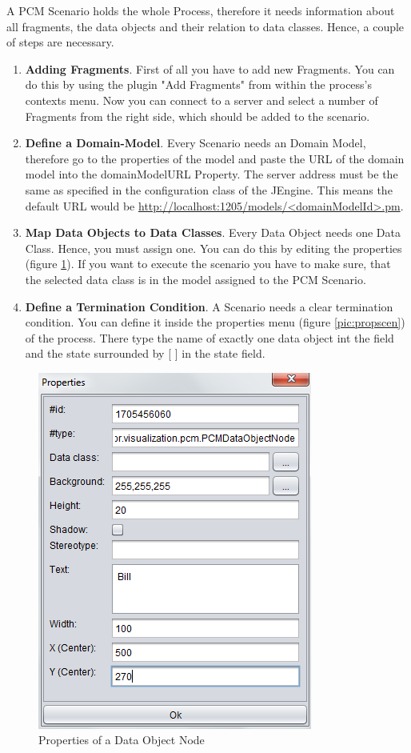 A PCM Scenario holds the whole Process, therefore it needs information about all fragments, the data objects and their relation to data classes. Hence, a couple of steps are necessary.
\begin{enumerate}
\item \textbf{Adding Fragments}.
First of all you have to add new Fragments. You can do this by using the plugin "Add Fragments" from within the process's contexts menu. Now you can connect to a server and select a number of Fragments from the right side, which should be added to the scenario.
\item \textbf{Define a Domain-Model}.
Every Scenario needs an Domain Model, therefore go to the properties of the model and paste the URL of the domain model into the domainModelURL Property. The server address must be the same as specified in the configuration class of the JEngine. This means the default URL would be \url{http://localhost:1205/models/<domainModelId>.pm}.
\item \textbf{Map Data Objects to Data Classes}.
Every Data Object needs one Data Class.
Hence, you must assign one.
You can do this by editing the properties (figure \ref{pic:propdo}). If you want to execute the scenario you have to make sure, that the selected data class is in the model assigned to the PCM Scenario.
\item \textbf{Define a Termination Condition}.
A Scenario needs a clear termination condition. You can define it inside the properties menu (figure \ref{pic:propscen}) of the process. There type the name of exactly one data object int the field and the state surrounded by [ ] in the state field.
\end{enumerate}
\begin{figure}[h!]
\includegraphics[height=0.4\textheight]{graphics/dataNodeProperties.png}
\caption{Properties of a Data Object Node}
\label{pic:propdo}
\end{figure}

